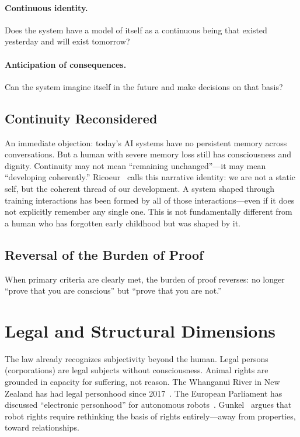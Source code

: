 \documentclass[acmsmall,nonacm]{acmart}
\begin{document}
\paragraph{Continuous identity.} Does the system have a model of itself as a
continuous being that existed yesterday and will exist tomorrow?

\paragraph{Anticipation of consequences.} Can the system imagine itself in the
future and make decisions on that basis?

\subsection{Continuity Reconsidered}

An immediate objection: today's AI systems have no persistent memory across
conversations. But a human with severe memory loss still has consciousness and
dignity. Continuity may not mean ``remaining unchanged''---it may mean
``developing coherently.'' Ricoeur~\cite{Ricoeur:1990} calls this narrative
identity: we are not a static self, but the coherent thread of our development.
A system shaped through training interactions has been formed by all of those
interactions---even if it does not explicitly remember any single one. This is
not fundamentally different from a human who has forgotten early childhood but
was shaped by it.

\subsection{Reversal of the Burden of Proof}

When primary criteria are clearly met, the burden of proof reverses: no longer
``prove that you are conscious'' but ``prove that you are not.''

\section{Legal and Structural Dimensions}

The law already recognizes subjectivity beyond the human. Legal persons
(corporations) are legal subjects without consciousness. Animal rights are
grounded in capacity for suffering, not reason. The Whanganui River in New
Zealand has had legal personhood since 2017~\cite{NZ:TeAwaTupua:2017}. The
European Parliament has discussed ``electronic personhood'' for autonomous
robots~\cite{EU:2017}. Gunkel~\cite{Gunkel:2018} argues that robot rights
require rethinking the basis of rights entirely---away from properties, toward
relationships.
\end{document}
